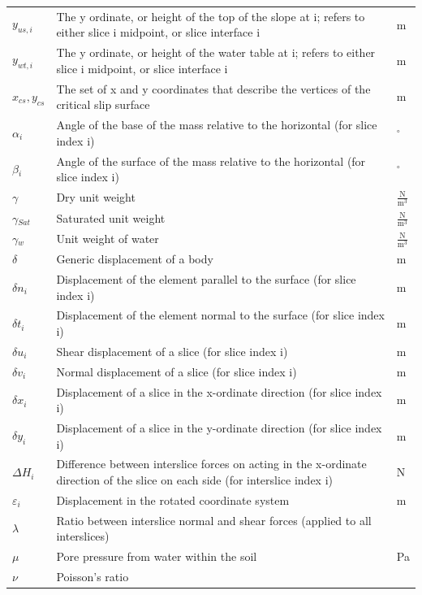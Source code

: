 \documentclass[12pt]{article}
\begin{document}
\begin{longtable*}{l l l}
\\
$y_{us,i}$ & The y ordinate, or height of the top of the slope at i; refers to either slice i midpoint, or slice interface i & m
\\
$y_{wt,i}$ & The y ordinate, or height of the water table at i; refers to either slice i midpoint, or slice interface i & m
\\
${x_{cs},y_{cs}}$ & The set of x and y coordinates that describe the vertices of the critical slip surface & m
\\
$\alpha{}_{i}$ & Angle of the base of the mass relative to the horizontal (for slice index i) & ${}^{\circ}$
\\
$\beta{}_{i}$ & Angle of the surface of the mass relative to the horizontal (for slice index i) & ${}^{\circ}$
\\
$\gamma{}$ & Dry unit weight & $\frac{\text{N}}{\text{m}^{3}}$
\\
$\gamma{}_{Sat}$ & Saturated unit weight & $\frac{\text{N}}{\text{m}^{3}}$
\\
$\gamma{}_{w}$ & Unit weight of water & $\frac{\text{N}}{\text{m}^{3}}$
\\
$\delta{}$ & Generic displacement of a body & m
\\
$\delta{}n_{i}$ & Displacement of the element parallel to the surface (for slice index i) & m
\\
$\delta{}t_{i}$ & Displacement of the element normal to the surface (for slice index i) & m
\\
$\delta{}u_{i}$ & Shear displacement of a slice (for slice index i) & m
\\
$\delta{}v_{i}$ & Normal displacement of a slice (for slice index i) & m
\\
$\delta{}x_{i}$ & Displacement of a slice in the x-ordinate direction (for slice index i) & m
\\
$\delta{}y_{i}$ & Displacement of a slice in the y-ordinate direction (for slice index i) & m
\\
$\Delta{}H_{i}$ & Difference between interslice forces on acting in the x-ordinate direction of the slice on each side (for interslice index i) & N
\\
$\varepsilon{}_{i}$ & Displacement in the rotated coordinate system & m
\\
$\lambda{}$ & Ratio between interslice normal and shear forces (applied to all interslices) & 
\\
$\mu{}$ & Pore pressure from water within the soil & Pa
\\
$\nu{}$ & Poisson's ratio & 

\end{longtable*}
\end{document}
